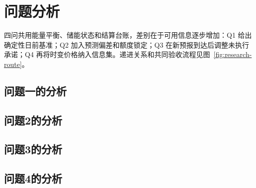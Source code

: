 \section{问题分析}
四问共用能量平衡、储能状态和结算台账，差别在于可用信息逐步增加：Q1 给出确定性日前基准；Q2 加入预测偏差和额度锁定；Q3 在新预报到达后调整未执行承诺；Q4 再将时变价格纳入信息集。递进关系和共同验收流程见图~\ref{fig:research-route}。

\subsection{问题一的分析}

\ifQTwoReady
\subsection{问题2的分析}

\else
{}
\fi
\ifQThreeReady
\subsection{问题3的分析}

\else
{}
\fi
\ifQFourReady
\subsection{问题4的分析}

\else
{}
\fi

